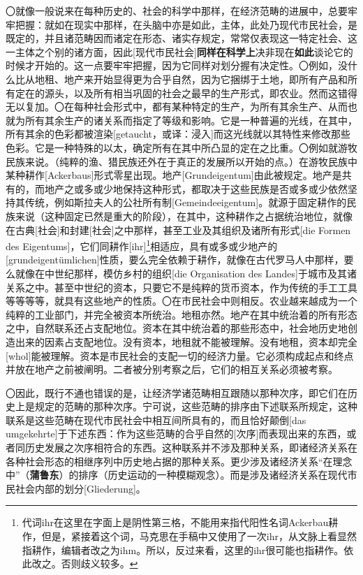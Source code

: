 \documentclass[a4paper,twoside,12pt]{ctexart}
\begin{document}
〇就像一般说来在每种历史的、社会的科学中那样，在经济范畴的进展中，总要牢牢把握：就如在现实中那样，在头脑中亦是如此，主体，此处乃现代市民社会，是既定的，并且诸范畴因而诸定在形态、诸实存规定，常常仅表现这一特定社会、这一主体之个别的诸方面，因此[现代市民社会]\textbf{同样在科学上}决非现在\textbf{如此}谈论它的时候才开始的。这一点要牢牢把握，因为它同样对划分握有决定性。〇例如，没什么比从地租、地产来开始显得更为合乎自然，因为它捆绑于土地，即所有产品和所有定在的源头，以及所有相当巩固的社会之最早的生产形式，即农业。然而这错得无以复加。〇在每种社会形式中，都有某种特定的生产，为所有其余生产、从而也就为所有其余生产的诸关系而指定了等级和影响。它是一种普遍的光线，在其中，所有其余的色彩都被渲染[getaucht，或译：浸入]而这光线就以其特性来修改那些色彩。它是一种特殊的以太，确定所有在其中所凸显的定在之比重。〇例如就游牧民族来说。（纯粹的渔、猎民族还外在于真正的发展所以开始的点。）在游牧民族中某种耕作[Ackerbaus]形式零星出现。地产[Grundeigentum]由此被规定。地产是共有的，而地产之或多或少地保持这种形式，都取决于这些民族是否或多或少依然坚持其传统，例如斯拉夫人的公社所有制[Gemeindeeigentum]。就源于固定耕作的民族来说（这种固定已然是重大的阶段），在其中，这种耕作之占据统治地位，就像在古典[社会]和封建[社会]之中那样，甚至工业及其组织及诸所有形式[die Formen des Eigentums]，它们同耕作[ihr]\footnote{代词ihr在这里在字面上是阴性第三格，不能用来指代阳性名词Ackerbau耕作，但是，紧接着这个词，马克思在手稿中又使用了一次ihr，从文脉上看显然指耕作，编辑者改之为ihm。所以，反过来看，这里的ihr很可能也指耕作。依此改之。否则歧义较多。}相适应，具有或多或少地产的[grundeigentümlichen]性质，要么完全依赖于耕作，就像在古代罗马人中那样，要么就像在中世纪那样，模仿乡村的组织[die Organisation des Landes]于城市及其诸关系之中。甚至中世纪的资本，只要它不是纯粹的货币资本，作为传统的手工工具等等等等，就具有这些地产的性质。〇在市民社会中则相反。农业越来越成为一个纯粹的工业部门，并完全被资本所统治。地租亦然。地产在其中统治着的所有形态之中，自然联系还占支配地位。资本在其中统治着的那些形态中，社会地历史地创造出来的因素占支配地位。没有资本，地租就不能被理解。没有地租，资本却完全[whol]能被理解。资本是市民社会的支配一切的经济力量。它必须构成起点和终点并放在地产之前被阐明。二者被分别考察之后，它们的相互关系必须被考察。

〇因此，既行不通也错误的是，让经济学诸范畴相互跟随以那种次序，即它们在历史上是规定的范畴的那种次序。宁可说，这些范畴的排序由下述联系所规定，这种联系是这些范畴在现代市民社会中相互间所具有的，而且恰好颠倒[das umgekehrte]于下述东西：作为这些范畴的合乎自然的[次序]而表现出来的东西，或者同历史发展之次序相符合的东西。这种联系并不涉及那种关系，即诸经济关系在各种社会形态的相继序列中历史地占据的那种关系。更少涉及诸经济关系“在理念中”（\textbf{蒲鲁东}）的排序（历史运动的一种模糊观念）。而是涉及诸经济关系在现代市民社会内部的划分[Gliederung]。
\end{document}
